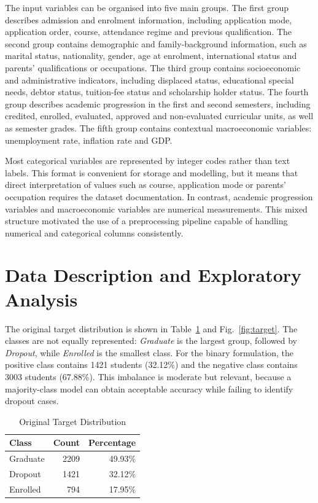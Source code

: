 \documentclass[conference]{IEEEtran}
\begin{document}
The input variables can be organised into five main groups. The first group describes admission and enrolment information, including application mode, application order, course, attendance regime and previous qualification. The second group contains demographic and family-background information, such as marital status, nationality, gender, age at enrolment, international status and parents' qualifications or occupations. The third group contains socioeconomic and administrative indicators, including displaced status, educational special needs, debtor status, tuition-fee status and scholarship holder status. The fourth group describes academic progression in the first and second semesters, including credited, enrolled, evaluated, approved and non-evaluated curricular units, as well as semester grades. The fifth group contains contextual macroeconomic variables: unemployment rate, inflation rate and GDP.

Most categorical variables are represented by integer codes rather than text labels. This format is convenient for storage and modelling, but it means that direct interpretation of values such as course, application mode or parents' occupation requires the dataset documentation. In contrast, academic progression variables and macroeconomic variables are numerical measurements. This mixed structure motivated the use of a preprocessing pipeline capable of handling numerical and categorical columns consistently.

\section{Data Description and Exploratory Analysis}
The original target distribution is shown in Table~\ref{tab:target} and Fig.~\ref{fig:target}. The classes are not equally represented: \textit{Graduate} is the largest group, followed by \textit{Dropout}, while \textit{Enrolled} is the smallest class. For the binary formulation, the positive class contains 1421 students (32.12\%) and the negative class contains 3003 students (67.88\%). This imbalance is moderate but relevant, because a majority-class model can obtain acceptable accuracy while failing to identify dropout cases.

\begin{table}[htbp]
\caption{Original Target Distribution}
\label{tab:target}
\centering
\begin{tabular}{lrr}
\toprule
Class & Count & Percentage \\
\midrule
Graduate & 2209 & 49.93\% \\
Dropout & 1421 & 32.12\% \\
Enrolled & 794 & 17.95\% \\
\bottomrule
\end{tabular}
\end{table}
\end{document}

